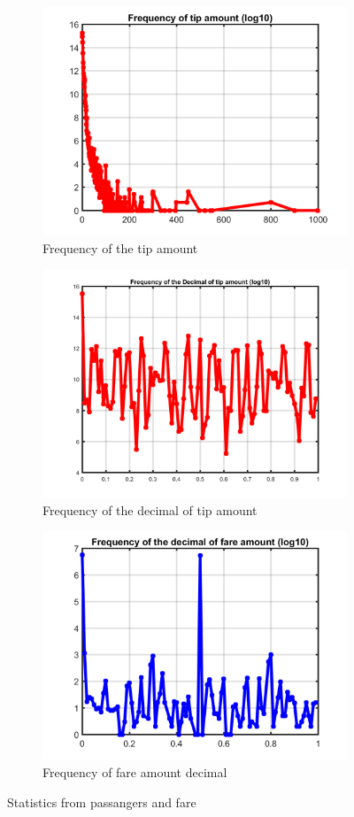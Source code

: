 \documentclass{article}
\begin{document}
\begin{figure}
\begin{subfigure}{.5\linewidth}
  \centering
  \includegraphics[width=.8\linewidth]{frequency-tipamount}
  \caption{Frequency of the tip amount}
  \label{fig:sub5}
\end{subfigure}%
\begin{subfigure}{.5\linewidth}
  \centering
  \includegraphics[width=.8\linewidth]{frequency-decimal-tipamount}
  \caption{Frequency of the decimal of tip amount}
  \label{fig:sub6}
\end{subfigure}

\begin{subfigure}{\linewidth}
  \centering
  \includegraphics[width=.4\linewidth]{frequency-decimal-fareamount}
  \caption{Frequency of fare amount decimal}
  \label{fig:sub7}
\end{subfigure}
\caption{Statistics from passangers and fare}
\label{fig:test}
\end{figure}
\end{document}
